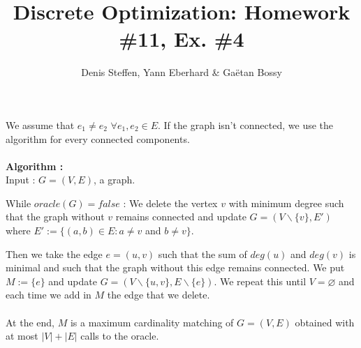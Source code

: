 \documentclass[a4paper,11pt,french]{article}
\title{Discrete Optimization: Homework \#11, Ex. \#4}
\author{Denis Steffen, Yann Eberhard \& Gaëtan Bossy}
\begin{document}
    
    \maketitle

    We assume that $ e_1 \neq  e_2$  $\forall e_1,e_2\in E$.  If the graph isn't connected, we use the algorithm for every connected components.\\\\
    
    
    \textbf{Algorithm :} \\
    Input : $G=(V,E)$, a graph.
    
    
    While $oracle(G)=false$ : We delete the vertex $v$ with minimum degree such that the graph without $v$ remains connected and update $G=(V\backslash{\{v\}},E')$ where $E' := \{(a,b) \in E : a\neq  v$ and $b \neq v \}$.
    
    
    Then we take the edge $e=(u,v)$ such that the sum of $deg(u)$ and $deg(v)$ is minimal and such that the graph without this edge remains connected. We put $M:=\{ e\}$ and update $G=(V\backslash \{u,v\},E\backslash \{e\})$. We repeat this until $V=\varnothing$ and each time we add in $M$ the edge that we delete.  \\\\
    



At the end, $M$ is a maximum cardinality matching of $G=(V,E)$ obtained with at most $|V|+|E|$ calls to the oracle.
  
\end{document}
